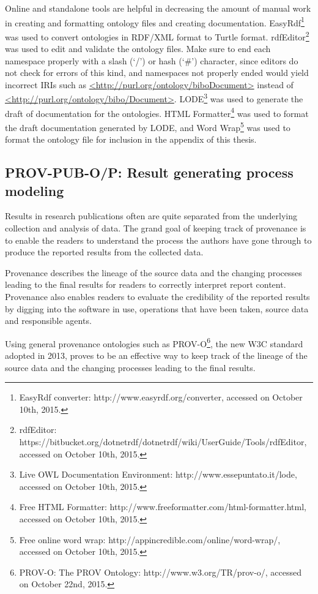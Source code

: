 Online and standalone tools are helpful in decreasing the amount of manual work in creating and formatting ontology files and creating documentation. EasyRdf\footnote{EasyRdf converter: http://www.easyrdf.org/converter, accessed on October 10th, 2015.} was used to convert ontologies in RDF/XML format to Turtle format. rdfEditor\footnote{rdfEditor: https://bitbucket.org/dotnetrdf/dotnetrdf/wiki/UserGuide/Tools/rdfEditor, accessed on October 10th, 2015.} was used to edit and validate the ontology files. Make sure to end each namespace properly with a slash (`/') or hash (`\#') character, since editors do not check for errors of this kind, and namespaces not properly ended would yield incorrect IRIs such as \url{<http://purl.org/ontology/biboDocument>} instead of \url{<http://purl.org/ontology/bibo/Document>}. LODE\footnote{Live OWL Documentation Environment: http://www.essepuntato.it/lode, accessed on October 10th, 2015.} was used to generate the draft of documentation for the ontologies. HTML Formatter\footnote{Free HTML Formatter: http://www.freeformatter.com/html-formatter.html, accessed on October 10th, 2015.} was used to format the draft documentation generated by LODE, and Word Wrap\footnote{Free online word wrap: http://appincredible.com/online/word-wrap/, accessed on October 10th, 2015.} was used to format the ontology file for inclusion in the appendix of this thesis.


\subsection{PROV-PUB-O/P: Result generating process modeling}
\label{subsec:process}
Results in research publications often are quite separated from the underlying collection and analysis of data. The grand goal of keeping track of provenance is to enable the readers to understand the process the authors have gone through to produce the reported results from the collected data.

Provenance describes the lineage of the source data and the changing processes leading to the final results for readers to correctly interpret report content. Provenance also enables readers to evaluate the credibility of the reported results by digging into the software in use, operations that have been taken, source data and responsible agents.

Using general provenance ontologies such as PROV-O\footnote{PROV-O: The PROV Ontology: http://www.w3.org/TR/prov-o/, accessed on October 22nd, 2015.}, the new W3C standard adopted in 2013, proves to be an effective way to keep track of the lineage of the source data and the changing processes leading to the final results.

